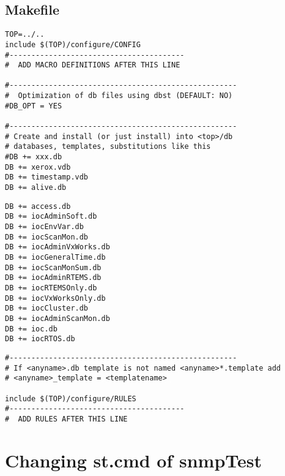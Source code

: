 \documentclass[11pt
  , a4paper
  , article
  , oneside
]{memoir}
\begin{document}
\subsection{Makefile}
\begin{lstlisting}[style=termstyle]
TOP=../..
include $(TOP)/configure/CONFIG
#----------------------------------------
#  ADD MACRO DEFINITIONS AFTER THIS LINE

#----------------------------------------------------
#  Optimization of db files using dbst (DEFAULT: NO)
#DB_OPT = YES

#----------------------------------------------------
# Create and install (or just install) into <top>/db
# databases, templates, substitutions like this
#DB += xxx.db
DB += xerox.vdb
DB += timestamp.vdb
DB += alive.db
\end{lstlisting}
\begin{lstlisting}[style=termstyle]
DB += access.db 
DB += iocAdminSoft.db
DB += iocEnvVar.db
DB += iocScanMon.db
DB += iocAdminVxWorks.db
DB += iocGeneralTime.db
DB += iocScanMonSum.db
DB += iocAdminRTEMS.db
DB += iocRTEMSOnly.db
DB += iocVxWorksOnly.db
DB += iocCluster.db
DB += iocAdminScanMon.db
DB += ioc.db
DB += iocRTOS.db
\end{lstlisting}
\begin{lstlisting}[style=termstyle]
#----------------------------------------------------
# If <anyname>.db template is not named <anyname>*.template add
# <anyname>_template = <templatename>

include $(TOP)/configure/RULES
#----------------------------------------
#  ADD RULES AFTER THIS LINE
\end{lstlisting}

\section{Changing st.cmd of snmpTest}
\end{document}
